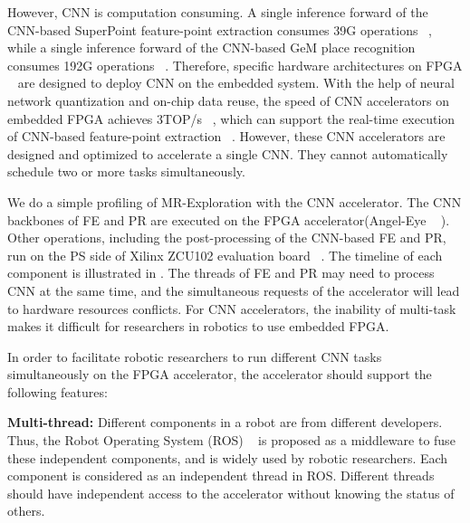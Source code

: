 However, CNN is computation consuming. A single inference forward of the CNN-based SuperPoint feature-point extraction consumes 39G operations  ~\cite{detone2018superpoint}, while a single inference forward of the CNN-based GeM  place recognition consumes 192G operations  ~\cite{radenovic2018fine}.
Therefore, specific hardware architectures on FPGA  ~\cite{guo2017angel,yu2018instruction,li_high_2016,qiu2016going,lu_evaluating_2017} are designed to deploy CNN on the embedded system.
With the help of neural network quantization and on-chip data reuse, the speed of CNN accelerators on embedded FPGA achieves 3TOP/s  ~\cite{lu_evaluating_2017}, which can support the real-time execution of CNN-based feature-point extraction  ~\cite{detone2018superpoint}.
However, these CNN accelerators are designed and optimized to accelerate a single CNN. They cannot automatically schedule two or more tasks simultaneously. 



We do a simple profiling of MR-Exploration with the CNN accelerator. The CNN backbones of FE and  PR are executed on the FPGA accelerator(Angel-Eye ~\cite{guo2017angel} ).
Other operations, including the post-processing of the CNN-based FE and PR, run on the PS side of Xilinx ZCU102 evaluation board ~\cite{zcu102}. The timeline of each component is illustrated in . 
The threads of FE and PR may need to process CNN at the same time,  and the simultaneous requests of the accelerator will lead to hardware resources conflicts. For CNN accelerators, the inability of multi-task makes it difficult for researchers in robotics to use embedded FPGA.

In order to facilitate robotic researchers to run different CNN tasks simultaneously on the FPGA accelerator, the accelerator should support the following features:

\textbf{Multi-thread:} Different components in a robot are from different developers. Thus, the Robot Operating System (ROS)  ~\cite{quigley2009ros} is proposed as a middleware to fuse these independent components, and is widely used by robotic researchers. Each component is considered as an independent thread in ROS. Different threads should have independent access to the accelerator without knowing the status of others.


